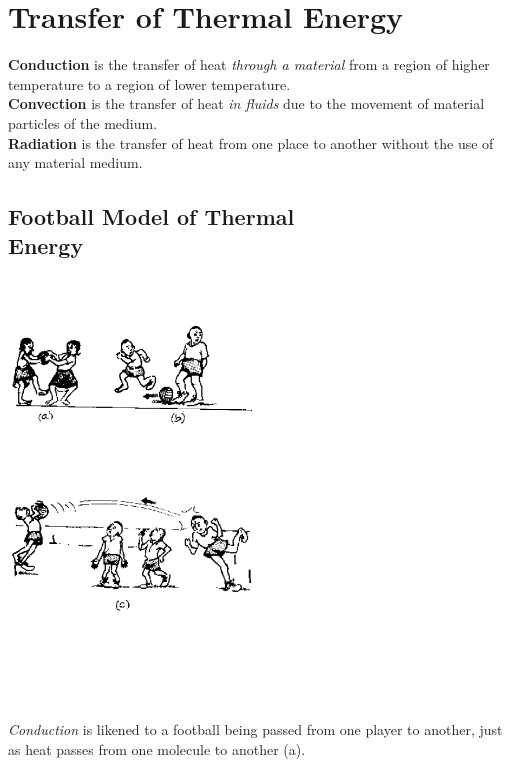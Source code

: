 \section{Transfer of Thermal Energy}

\textbf{Conduction} is the transfer of heat \emph{through a material} from a region of higher temperature to a region of lower temperature.\\
\textbf{Convection} is the transfer of heat \emph{in fluids} due to the movement of material particles of the medium.\\
\textbf{Radiation} is the transfer of heat from one place to another without the use of any material medium.

\begin{multicols}{2}


\subsection[Football Model of Thermal Energy]{Football Model of Thermal \hfill \\ Energy}

\begin{center}
\includegraphics[width=0.49\textwidth]{./img/source/football-thermal.png}
\end{center}

\emph{Conduction} is likened to a football being passed from one player to another, just as heat passes from one molecule to another (a).


\end{multicols}
